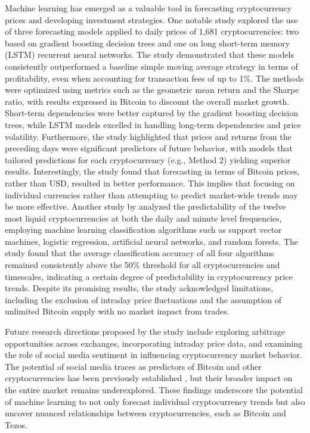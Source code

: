 Machine learning has emerged as a valuable tool in forecasting cryptocurrency prices and developing investment strategies. One notable study \autocite{alessandretti2018anticipating} explored the use of three forecasting models applied to daily prices of 1,681 cryptocurrencies: two based on gradient boosting decision trees and one on long short-term memory (LSTM) recurrent neural networks. The study demonstrated that these models consistently outperformed a baseline simple moving average strategy in terms of profitability, even when accounting for transaction fees of up to 1\%.
The methods were optimized using metrics such as the geometric mean return and the Sharpe ratio, with results expressed in Bitcoin to discount the overall market growth. Short-term dependencies were better captured by the gradient boosting decision trees, while LSTM models excelled in handling long-term dependencies and price volatility. Furthermore, the study highlighted that prices and returns from the preceding days were significant predictors of future behavior, with models that tailored predictions for each cryptocurrency (e.g., Method 2) yielding superior results.
Interestingly, the study found that forecasting in terms of Bitcoin prices, rather than USD, resulted in better performance. This implies that focusing on individual currencies rather than attempting to predict market-wide trends may be more effective. Another study by \textcite{akyildirim2021prediction} analyzed the predictability of the twelve most liquid cryptocurrencies at both the daily and minute level frequencies, 
employing machine learning classification algorithms such as support vector machines, logistic regression, artificial neural networks, and random forests.
 The study found that the average classification accuracy of all four algorithms remained consistently above the 50\% threshold for all cryptocurrencies and timescales, indicating a certain degree of predictability in cryptocurrency price trends. 
  Despite its promising results, the study acknowledged limitations, including the exclusion of intraday price fluctuations and the assumption of unlimited Bitcoin supply with no market impact from trades.

Future research directions proposed by the study include exploring arbitrage opportunities across exchanges, incorporating intraday price data, and examining the role of social media sentiment in influencing cryptocurrency market behavior. The potential of social media traces as predictors of Bitcoin and other cryptocurrencies has been previously established \parencite{poongodi2021global}, but their broader impact on the entire market remains underexplored.
These findings underscore the potential of machine learning to not only forecast individual cryptocurrency trends but also uncover nuanced relationships between cryptocurrencies, such as Bitcoin and Tezos.

